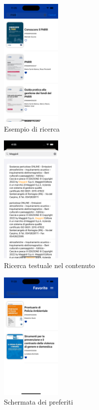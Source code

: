 \begin{multicols}{3}
    \begin{figure}[H]
        \centering
        \includegraphics[width=0.26\textwidth]{img/Simulator Screen Shot - iPhone 14 Pro - 2022-10-05 at 11.25.21.png}
        \caption{Esempio di ricerca}
        \label{ricerca-ios}
    \end{figure}

    \begin{figure}[H]
        \centering
        \includegraphics[width=0.26\textwidth]{img/ricerca_testo_ios.png}
        \caption{Ricerca testuale nel contenuto}
        \label{ricerca_testo-ios}
    \end{figure}

    \begin{figure}[H]
        \centering
        \includegraphics[width=0.26\textwidth]{img/Simulator Screen Shot - iPhone 14 Pro - 2022-10-05 at 11.20.04.png}
        \caption{Schermata dei preferiti}
        \label{preferiti-ios}
    \end{figure}


\end{multicols}
